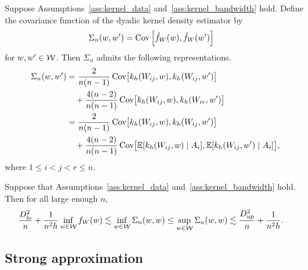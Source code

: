 \begin{lemma}
  \label{lem:covariance_structure}

  Suppose Assumptions~\ref{ass:kernel_data}
  and~\ref{ass:kernel_bandwidth} hold.
  Define the covariance function of the
  dyadic kernel density estimator by
  \begin{align*}
    \Sigma_n(w,w')
    &=
    \operatorname{Cov}\Big[
      \hat f_W(w),
      \hat f_W(w')
    \Big]
  \end{align*}
  for $w,w' \in \mathcal{W}$.
  Then $\Sigma_n$ admits the following
  representations.
  \begin{align*}
    \Sigma_n(w,w')
    &=
    \frac{2}{n(n-1)}
    \operatorname{Cov}\hspace*{-0.7mm}\big[
      k_h(W_{i j},w),
      k_h(W_{i j},w')
    \big] \\
    &\quad+
    \frac{4(n-2)}{n(n-1)}
    \operatorname{Cov}\hspace*{-0.7mm}\big[
      k_h(W_{i j},w),
      k_h(W_{i r},w')
    \big] \\
    &=
    \frac{2}{n(n-1)}
    \operatorname{Cov}\hspace*{-0.7mm}\big[
      k_h(W_{i j},w),
      k_h(W_{i j},w')
    \big] \\
    &\quad+
    \frac{4(n-2)}{n(n-1)}
    \operatorname{Cov}\hspace*{-0.7mm}\big[
      \mathbb{E}[k_h(W_{i j},w) \mid A_i],
      \mathbb{E}[k_h(W_{i j},w') \mid A_i]
    \big],
  \end{align*}
  where $1 \leq i < j < r \leq n$.

\end{lemma}

\begin{lemma}
  \label{lem:app_variance_bounds}

  Suppose that Assumptions~\ref{ass:kernel_data}
  and~\ref{ass:kernel_bandwidth} hold.
  Then for all large enough $n$,
  \begin{align*}
    \frac{D_{\textup{lo}}^2}{n}
    + \frac{1}{n^2h}
    \inf_{w \in \mathcal{W}} f_W(w)
    &\lesssim
    \inf_{w \in \mathcal{W}} \Sigma_n(w,w)
    \leq
    \sup_{w \in \mathcal{W}} \Sigma_n(w,w)
    \lesssim
    \frac{D_{\textup{up}}^2}{n}
    + \frac{1}{n^2h}.
  \end{align*}

\end{lemma}

\subsection{Strong approximation}
\label{sec:strong_approx}

